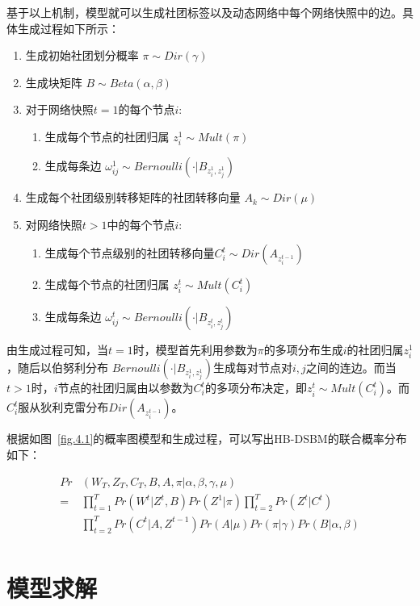 基于以上机制，模型就可以生成社团标签以及动态网络中每个网络快照中的边。具体生成过程如下所示：
\begin{enumerate}
	\item 生成初始社团划分概率 ${\pi} \sim Dir({\gamma})$
	\item 生成块矩阵 $B \sim Beta({\alpha},{\beta})$
	\item 对于网络快照$t=1$的每个节点$i$:
	\begin{enumerate}
		\item 生成每个节点的社团归属 $z_i^1 \sim Mult({\pi})$ 
		\item 生成每条边 $\omega_{ij}^1 \sim Bernoulli(\cdot | B_{z_i^1,z_j^1})$
	\end{enumerate}
	\item 生成每个社团级别转移矩阵的社团转移向量 ${A}_k \sim Dir({\mu})$
	\item 对网络快照$t>1$中的每个节点$i$:
	\begin{enumerate}
		\item 生成每个节点级别的社团转移向量${C}_i^t \sim Dir({A}_{z_i^{t-1}})$
		\item 生成每个节点的社团归属 $z_i^t \sim Mult({C}_i^t)$
		\item 生成每条边 $\omega_{ij}^t \sim Bernoulli(\cdot | B_{z_i^t,z_j^t})$
	\end{enumerate}
\end{enumerate}

由生成过程可知，当$t=1$时，模型首先利用参数为$\pi$的多项分布生成$i$的社团归属$z_i^1$，随后以伯努利分布 $Bernoulli(\cdot|B_{z_i^1,z_j^1})$生成每对节点对$i,j$之间的连边。而当$t>1$时，$i$节点的社团归属由以参数为$C_i^t$的多项分布决定，即$z_i^t \sim Mult({C}_i^t)$。而$C_i^t$服从狄利克雷分布$Dir(A_{z_i^{t-1}})$。

根据如图~\ref{fig.4.1}的概率图模型和生成过程，可以写出HB-DSBM的联合概率分布如下：

\begin{equation}
\begin{split}
Pr&(W_T,Z_T,C_T,B,A,\pi|\alpha,\beta,\gamma,\mu) \\
= & \prod_{t=1}^T Pr(W^t | Z^t,B) Pr(Z^1|\pi) \prod_{t=2}^T Pr(Z^t|C^t) \\
& \prod_{t=2}^T Pr(C^t|A,Z^{t-1}) Pr(A|\mu) Pr(\pi|\gamma) Pr(B|\alpha,\beta) \\
\end{split}
\end{equation}

\section{模型求解}

